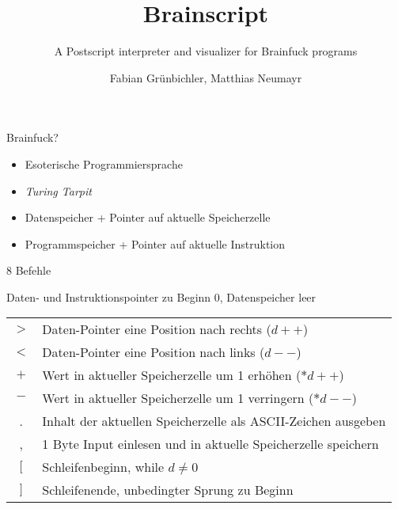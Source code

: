 \documentclass{beamer}
\title[Brainscript]{Brainscript}
\subtitle{A Postscript interpreter and visualizer for Brainfuck programs}
\author{Fabian Grünbichler, Matthias Neumayr}
\begin{document}
\frame{
    \titlepage
}


\begin{frame}{Brainfuck?}

    \begin{itemize}
        \item Esoterische Programmiersprache
        \item \emph{Turing Tarpit}
        \item Datenspeicher + Pointer auf aktuelle Speicherzelle
        \item Programmspeicher + Pointer auf aktuelle Instruktion
    \end{itemize}

\end{frame}

\begin{frame}{8 Befehle}

    \begin{center}
        Daten- und Instruktionspointer zu Beginn $0$, Datenspeicher leer\\ 
        \begin{table}
            \begin{tabular}[h!]{c|l}
                $>$ & Daten-Pointer eine Position nach rechts ($d++$) \\ 
                $<$ & Daten-Pointer eine Position nach links ($d--$) \\
                $+$ & Wert in aktueller Speicherzelle um 1 erhöhen ($*d++$) \\
                $-$ & Wert in aktueller Speicherzelle um 1 verringern ($*d--$) \\
                . & Inhalt der aktuellen Speicherzelle als ASCII-Zeichen ausgeben \\
                , & 1 Byte Input einlesen und in aktuelle Speicherzelle speichern \\
                $[$ & Schleifenbeginn, while  $d \neq 0$ \\
                $]$ & Schleifenende, unbedingter Sprung zu Beginn \\
            \end{tabular}
        \end{table}
    \end{center}

\end{frame}
\end{document}
